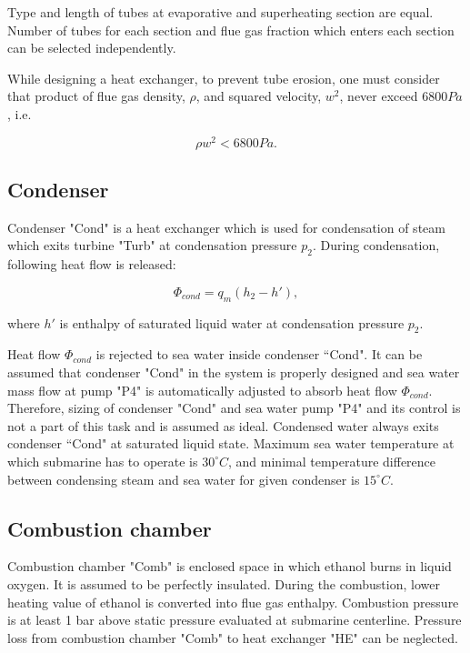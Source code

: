 \documentclass{article}
\begin{document}
	Type and length of tubes at evaporative and superheating section are equal. Number of tubes for each section and flue gas fraction which enters each section can be selected independently.  
	
	While designing a heat exchanger, to prevent tube erosion, one must consider that product of flue gas density, $\rho$, and squared velocity, $w^2$, never exceed $6800 Pa$, i.e. 
	
	\begin{equation}\label{eq:flue_gas_density}
		\rho w^2 < 6800 Pa.
	\end{equation}
	
	\subsection*{Condenser}
	
	\noindent
	Condenser "Cond" is a heat exchanger which is used for condensation of steam which exits turbine "Turb" at condensation pressure $p_2$. During condensation, following heat flow is released:
	
	\begin{equation}\label{eq:heat_flow_cond}
		\Phi_{cond} = q_m (h_2 - h'),
	\end{equation}
	
	\noindent
	where $h'$ is enthalpy of saturated liquid water at condensation pressure $p_2$.
	
	\noindent
	Heat flow $\Phi_{cond}$ is rejected to sea water inside condenser “Cond". It can be assumed that condenser "Cond" in the system is properly designed and sea water mass flow at pump "P4" is automatically adjusted to absorb heat flow $\Phi_{cond}$. Therefore, sizing of condenser "Cond" and sea water pump "P4" and its control is not a part of this task and is assumed as ideal. Condensed water always exits condenser “Cond" at saturated liquid state.
	Maximum sea water temperature at which submarine has to operate is $30^{\circ}C$, and minimal temperature difference between condensing steam and sea water for given condenser is $15^{\circ}C$. 
	
	\subsection*{Combustion chamber}
	
	Combustion chamber "Comb" is enclosed space in which ethanol burns in liquid oxygen. It is assumed to be perfectly insulated. During the combustion, lower heating value of ethanol is converted into flue gas enthalpy. Combustion pressure is at least 1 bar above static pressure evaluated at submarine centerline. Pressure loss from combustion chamber "Comb" to heat exchanger "HE" can be neglected.
	
\end{document}
